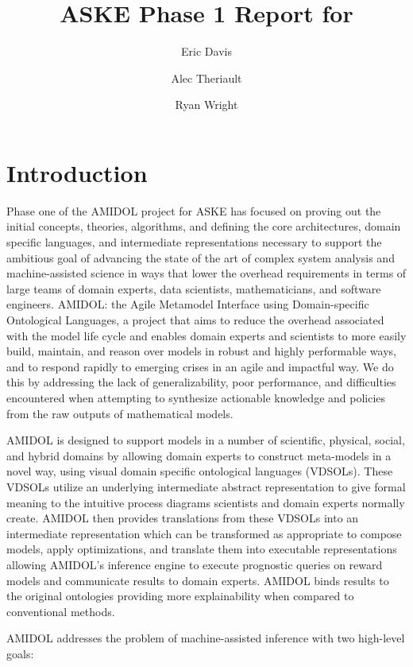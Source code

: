 \documentclass[11pt]{article}
\date{\vspace{-5ex}}
\author[1]{Eric Davis}
\author[1]{Alec Theriault}
\author[1]{Ryan Wright}
\affil[1]{Galois, Inc}
\title{ASKE Phase 1 Report for \amidol{}}
\newcommand{\amidol}{\textsc{AMIDOL}}
\begin{document}
\maketitle
\vspace{10pt}

\section{Introduction}

Phase one of the \amidol{} project for ASKE has focused on proving out the initial concepts, theories, algorithms, and defining the core architectures, domain specific languages, and intermediate representations necessary to support the ambitious goal of advancing the state of the art of complex system analysis and machine-assisted science in ways that lower the overhead requirements in terms of large teams of domain experts, data scientists, mathematicians, and software engineers.  \amidol{}: the Agile Metamodel Interface using Domain-specific Ontological Languages, a project that aims to reduce the overhead associated with the model life cycle and enables domain experts and scientists to more easily build, maintain, and reason over models in robust and highly performable ways, and to respond rapidly to emerging crises in an agile and impactful way.  We do this by addressing the lack of generalizability, poor performance, and difficulties encountered when attempting to synthesize actionable knowledge and policies from the raw outputs of mathematical models.

\amidol{} is designed to support models in a number of scientific, physical, social, and hybrid domains by allowing domain experts to construct meta-models in a novel way, using visual domain specific ontological languages (VDSOLs).  These VDSOLs utilize an underlying intermediate abstract representation to give formal meaning to the intuitive process diagrams scientists and domain experts normally create.  \amidol{} then provides translations from these VDSOLs into an intermediate representation which can be transformed as appropriate to compose models, apply optimizations, and translate them into executable representations allowing \amidol{}'s inference engine to execute prognostic queries on reward models and communicate results to domain experts. \amidol{} binds results to the original ontologies providing more explainability when compared to conventional methods.

\amidol{} addresses the problem of machine-assisted inference with two high-level goals:
\end{document}
